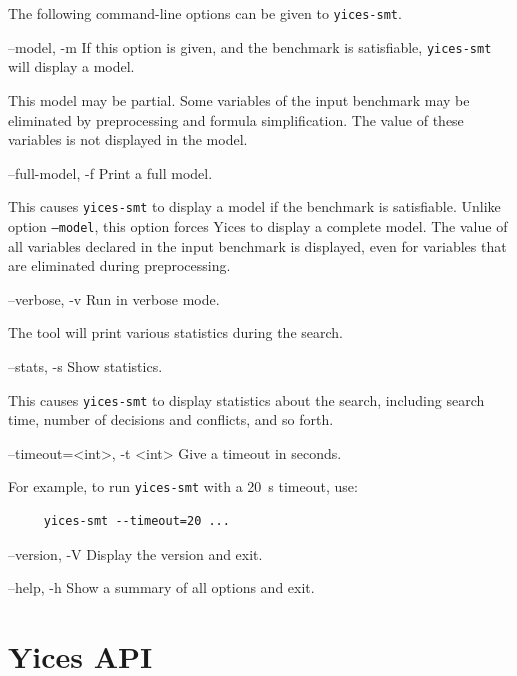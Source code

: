 \documentclass[11pt,twoside,fleqn,openright,titlepage]{cslreport}
\newenvironment{options}{
\begin{list}{}{
\setlength{\labelsep}{1.8ex}
\setlength{\labelwidth}{0pt}
\setlength{\itemindent}{-0.5\leftmargin}
\settowidth{\leftmargin}{\texttt{--}}
\renewcommand{\makelabel}{\optionlabel}}}
{\end{list}}
\newcommand*\optionlabel[1]{\hspace\labelsep\texttt{#1}}
\begin{document}
The following command-line options can be given to \texttt{yices-smt}.
\begin{options}
\item[--model, -m] If this option is given, and the benchmark
  is satisfiable, \texttt{yices-smt} will display a model.

  This model may be partial. Some variables of the input benchmark may
  be eliminated by preprocessing and formula simplification. The value
  of these variables is not displayed in the model.

\item[--full-model, -f] Print a full model.

  This causes \texttt{yices-smt} to display a model if the benchmark
  is satisfiable. Unlike option \texttt{--model}, this option forces
  Yices to display a complete model. The value of all variables
  declared in the input benchmark is displayed, even for variables
  that are eliminated during preprocessing.

\item[--verbose, -v] Run in verbose mode.

  The tool will print various statistics during the search.

\item[--stats, -s] Show statistics.

  This causes \texttt{yices-smt} to display statistics about the
  search, including search time, number of decisions and conflicts,
  and so forth.

\item[--timeout=<int>, -t <int>] Give a timeout in seconds.

  For example, to run \texttt{yices-smt} with a 20~s timeout, use:
  \begin{small}
  \vspace*{-2mm}
  \begin{verbatim}
     yices-smt --timeout=20 ...
  \end{verbatim}
  \vspace*{-7mm}
  \end{small}
\item[--version, -V] Display the version and exit.

\item[--help, -h] Show a summary of all options and exit.
\end{options}


\chapter{Yices API}
\label{yices-api}
\end{document}
